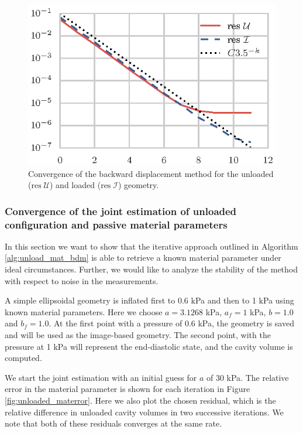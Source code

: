 \begin{figure}[htbp]
  \centering
  \includegraphics{figures/unloaded_error}
  \caption{\label{fig:unloaded_convergece_test}Convergence of the
    backward displacement method for the unloaded
    ($\mathrm{res}\;\mathcal{U}$) and loaded
    ($\mathrm{res}\;\mathcal{I}$) geometry.}
\end{figure}


\subsubsection{Convergence of the joint estimation of unloaded
  configuration and passive material parameters}
\label{sec:convergence_unloaded_material}

In this section we want to show that the iterative approach outlined
in Algorithm \ref{alg:unload_mat_bdm} is able to retrieve a known
material parameter under ideal circumstances. Further, we would like
to analyze the stability of the method with respect to noise in the
measurements.

A simple ellipsoidal geometry is inflated first to 0.6 kPa and then
to 1 kPa using known material parameters. Here we choose $a=3.1268$
kPa, $a_f = 1$ kPa, $b=1.0$ and $b_f=1.0$. At the first point with a
pressure of 0.6 kPa, the geometry is saved and will be used as the image-based
geometry. The second point, with the pressure at 1 kPa will represent
the end-diastolic state, and the cavity volume is computed.

We start the joint estimation with an initial guess for $a$ of 30
kPa. The relative error in the material
parameter is shown for each iteration in Figure
\ref{fig:unloaded_materror}. Here we also plot the chosen residual, which
is the relative difference in unloaded cavity volumes in two
successive iterations. We note that both of these residuals
converges at the same rate. 


